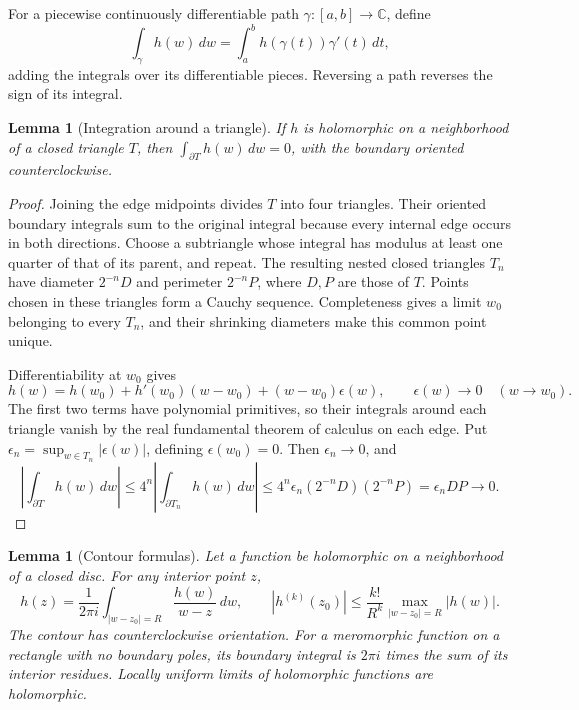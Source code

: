 \documentclass[11pt]{article}
\newtheorem{lemma}[theorem]{Lemma}
\theoremstyle{definition}
\theoremstyle{remark}
\numberwithin{equation}{section}
\newcommand{\C}{\mathbb C}
\begin{document}
For a piecewise continuously differentiable path $\gamma:[a,b]\to\C$,
define
\[
 \int_\gamma h(w)\,dw
   =\int_a^b h(\gamma(t))\gamma'(t)\,dt,
\]
adding the integrals over its differentiable pieces.
Reversing a path reverses the sign of its integral.

\begin{lemma}[Integration around a triangle]
\label{lem:weil-triangle-integral}
If $h$ is holomorphic on a neighborhood of a closed triangle $T$, then
$\int_{\partial T}h(w)\,dw=0$, with the boundary oriented counterclockwise.
\end{lemma}
\begin{proof}
Joining the edge midpoints divides $T$ into four triangles.
Their oriented boundary integrals sum to the original integral because
every internal edge occurs in both directions.
Choose a subtriangle whose integral has modulus at least one quarter
of that of its parent, and repeat.  The resulting nested closed triangles
$T_n$ have diameter $2^{-n}D$ and perimeter $2^{-n}P$, where $D,P$ are
those of $T$.  Points chosen in these triangles form a Cauchy sequence.
Completeness gives a limit $w_0$ belonging to every $T_n$, and their
shrinking diameters make this common point unique.

Differentiability at $w_0$ gives
\[
 h(w)=h(w_0)+h'(w_0)(w-w_0)+(w-w_0)\epsilon(w),
 \qquad \epsilon(w)\longrightarrow0\quad(w\to w_0).
\]
The first two terms have polynomial primitives, so their integrals around
each triangle vanish by the real fundamental theorem of calculus on each
edge.  Put $\epsilon_n=\sup_{w\in T_n}|\epsilon(w)|$, defining
$\epsilon(w_0)=0$.  Then $\epsilon_n\to0$, and
\[
 \left|\int_{\partial T}h(w)\,dw\right|
 \leq4^n\left|\int_{\partial T_n}h(w)\,dw\right|
 \leq4^n\epsilon_n(2^{-n}D)(2^{-n}P)
 =\epsilon_nDP\longrightarrow0.
\]
\end{proof}

\begin{lemma}[Contour formulas]
\label{lem:cauchy}
Let a function be holomorphic on a neighborhood of a closed disc.
For any interior point $z$,
\[
 h(z)=\frac1{2\pi i}\int_{|w-z_0|=R}\frac{h(w)}{w-z}\,dw,
 \qquad
 |h^{(k)}(z_0)|\leq \frac{k!}{R^k}\max_{|w-z_0|=R}|h(w)|.
\]
The contour has counterclockwise orientation.
For a meromorphic function on a rectangle with no boundary poles, its
boundary integral is $2\pi i$ times the sum of its interior residues.
Locally uniform limits of holomorphic functions are holomorphic.
\end{lemma}
\end{document}
